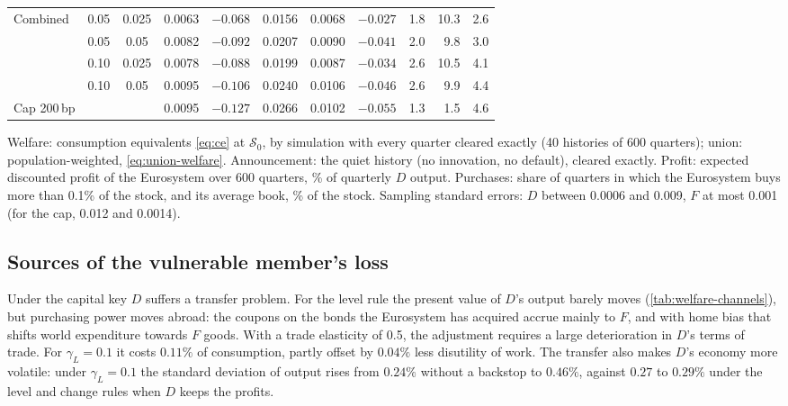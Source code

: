 \begin{table}[tbp]
\begin{threeparttable}
\begin{tabular}{lcc rrr rr r rr}
    Combined & 0.05 & 0.025 & 0.0063 & $-0.068$ & 0.0156 & 0.0068 & $-0.027$ & 1.8 & 10.3 & 2.6 \\
     & 0.05 & 0.05 & 0.0082 & $-0.092$ & 0.0207 & 0.0090 & $-0.041$ & 2.0 & 9.8 & 3.0 \\
     & 0.10 & 0.025 & 0.0078 & $-0.088$ & 0.0199 & 0.0087 & $-0.034$ & 2.6 & 10.5 & 4.1 \\
     & 0.10 & 0.05 & 0.0095 & $-0.106$ & 0.0240 & 0.0106 & $-0.046$ & 2.6 & 9.9 & 4.4 \\
    Cap 200\,bp &  &  & 0.0095 & $-0.127$ & 0.0266 & 0.0102 & $-0.055$ & 1.3 & 1.5 & 4.6 \\
    \bottomrule
  \end{tabular}
  \begin{tablenotes}\footnotesize
  \item Welfare: consumption equivalents \eqref{eq:ce} at $\mathcal S_0$, by simulation with every
  quarter cleared exactly (40 histories of 600 quarters); union: population-weighted,
  \eqref{eq:union-welfare}. Announcement: the quiet history (no innovation, no default), cleared
  exactly. Profit: expected discounted profit of the Eurosystem over 600 quarters, \% of quarterly
  $D$ output. Purchases: share of quarters in which the Eurosystem buys more than 0.1\% of the stock,
  and its average book, \% of the stock. Sampling standard errors: $D$ between 0.0006 and 0.009, $F$ at
  most 0.001 (for the cap, 0.012 and 0.0014).
  \end{tablenotes}
  \end{threeparttable}
\end{table}

\subsection{Sources of the vulnerable member's loss}
\label{sec:welfare-channels}

Under the capital key $D$ suffers a transfer problem. For the level rule the present value of $D$'s
output barely moves (\cref{tab:welfare-channels}), but purchasing power moves abroad: the coupons on
the bonds the Eurosystem has acquired accrue mainly to $F$, and with home bias that shifts world
expenditure towards $F$ goods. With a trade elasticity of 0.5, the adjustment requires a large
deterioration in $D$'s terms of trade. For $\gamma_L=0.1$ it costs $0.11\%$ of consumption, partly
offset by $0.04\%$ less disutility of work. The transfer also makes $D$'s economy more volatile: under
$\gamma_L=0.1$ the standard deviation of output rises from $0.24\%$ without a backstop to $0.46\%$,
against $0.27$ to $0.29\%$ under the level and change rules when $D$ keeps the profits.

